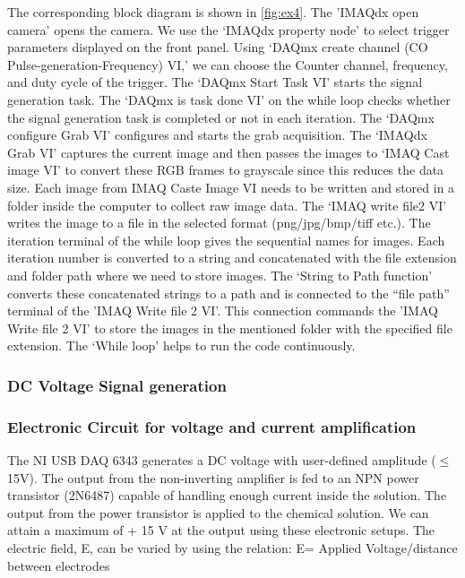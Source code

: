 \documentclass[journal=jacsat,manuscript=article]{achemso}
\begin{document}
The corresponding block diagram is shown in \ref{fig:ex4}. 
The 'IMAQdx open camera' opens the camera. We use the
‘IMAQdx property node’ to select trigger parameters displayed on the
front panel. Using ‘DAQmx create channel (CO
Pulse-generation-Frequency) VI,’ we can choose the Counter channel,
frequency, and duty cycle of the trigger. The ‘DAQmx Start Task VI’
starts the signal generation task.  The ‘DAQmx is task done VI’ on the
while loop checks whether the signal generation task is completed or
not in each iteration. The ‘DAQmx configure Grab VI’ configures and
starts the grab acquisition. The ‘IMAQdx Grab VI’ captures the current
image and then passes the images to ‘IMAQ Cast image VI’ to convert
these RGB frames to grayscale since this reduces the data size. Each
image from IMAQ Caste Image VI needs to be written and stored in a
folder inside the computer to collect raw image data. The ‘IMAQ write
file2 VI’ writes the image to a file in the selected format
(png/jpg/bmp/tiff etc.). The iteration terminal of the while loop
gives the sequential names for images. Each iteration number is
converted to a string and concatenated with the file extension and
folder path where we need to store images. The ‘String to Path
function’ converts these concatenated strings to a path and is
connected to the “file path” terminal of the 'IMAQ Write file 2
VI'. This connection commands the 'IMAQ Write file 2 VI' to store the
images in the mentioned folder with the specified file extension. The
‘While loop’ helps to run the code continuously.


\subsubsection{DC Voltage Signal generation}
\subsubsection{Electronic Circuit for voltage and current amplification}
The NI USB DAQ 6343 generates a DC voltage with user-defined
amplitude ($\leq$15V). The output from the non-inverting amplifier is fed to an
NPN power transistor (2N6487) capable of handling enough current
inside the solution. The output from the power transistor is applied
to the chemical solution. We can attain a maximum of + 15 V at the
output using these electronic setups. The electric field, E, can be
varied by using the relation: E= Applied Voltage/distance between
electrodes
\end{document}
